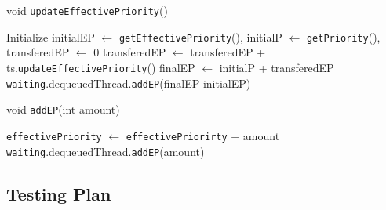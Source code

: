 \documentclass{article}
\begin{document}
\begin{spacing}{1.1}
\begin{algorithm}[htbp]
  \caption{void \texttt{updateEffectivePriority}()}
\begin{algorithmic}[1]
  \STATE Initialize initialEP $\leftarrow$ \texttt{getEffectivePriority}(), initialP $\leftarrow$ \texttt{getPriority}(), transferedEP $\leftarrow$ 0
      \STATE transferedEP $\leftarrow$ transferedEP + ts.\texttt{updateEffectivePriority}()
    \ENDFOR
  \ENDFOR
  \STATE finalEP $\leftarrow$ initialP + transferedEP
  \STATE \texttt{waiting}.dequeuedThread.\texttt{addEP}(finalEP-initialEP)
\end{algorithmic}
\end{algorithm}

\begin{algorithm}[htbp]
  \caption{void \texttt{addEP}(int amount)}
\begin{algorithmic}[1]
  \STATE  \texttt{effectivePriority} $\leftarrow$ \texttt{effectivePriorirty} + amount
  \STATE \texttt{waiting}.dequeuedThread.\texttt{addEP}(amount)
\end{algorithmic}
\end{algorithm}


\subsection{Testing Plan}


\end{spacing}
\end{document}
